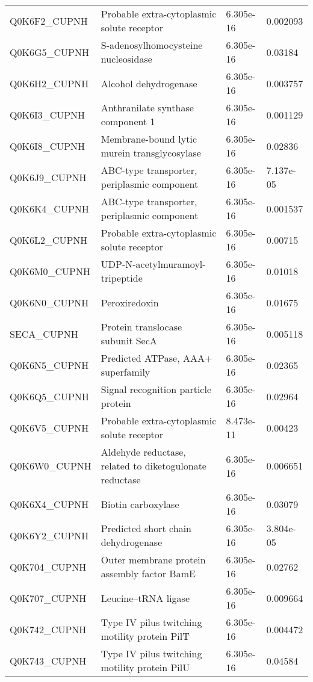 \begin{center}
\begin{longtable}{ l l l l }
Q0K6F2\_CUPNH & Probable extra-cytoplasmic solute receptor& 6.305e-16 & 0.002093 \\ [0.5ex]
Q0K6G5\_CUPNH & S-adenosylhomocysteine nucleosidase& 6.305e-16 & 0.03184 \\ [0.5ex]
Q0K6H2\_CUPNH & Alcohol dehydrogenase& 6.305e-16 & 0.003757 \\ [0.5ex]
Q0K6I3\_CUPNH & Anthranilate synthase component 1& 6.305e-16 & 0.001129 \\ [0.5ex]
Q0K6I8\_CUPNH & Membrane-bound lytic murein transglycosylase& 6.305e-16 & 0.02836 \\ [0.5ex]
Q0K6J9\_CUPNH & ABC-type transporter, periplasmic component & 6.305e-16 & 7.137e-05 \\ [0.5ex]
Q0K6K4\_CUPNH & ABC-type transporter, periplasmic component& 6.305e-16 & 0.001537 \\ [0.5ex]
Q0K6L2\_CUPNH & Probable extra-cytoplasmic solute receptor& 6.305e-16 & 0.00715 \\ [0.5ex]
Q0K6M0\_CUPNH & UDP-N-acetylmuramoyl-tripeptide & 6.305e-16 & 0.01018 \\ [0.5ex]
Q0K6N0\_CUPNH & Peroxiredoxin& 6.305e-16 & 0.01675 \\ [0.5ex]
SECA\_CUPNH & Protein translocase subunit SecA& 6.305e-16 & 0.005118 \\ [0.5ex]
Q0K6N5\_CUPNH & Predicted ATPase, AAA+ superfamily& 6.305e-16 & 0.02365 \\ [0.5ex]
Q0K6Q5\_CUPNH & Signal recognition particle protein& 6.305e-16 & 0.02964 \\ [0.5ex]
Q0K6V5\_CUPNH & Probable extra-cytoplasmic solute receptor& 8.473e-11 & 0.00423 \\ [0.5ex]
Q0K6W0\_CUPNH & Aldehyde reductase, related to diketogulonate reductase& 6.305e-16 & 0.006651 \\ [0.5ex]
Q0K6X4\_CUPNH & Biotin carboxylase& 6.305e-16 & 0.03079 \\ [0.5ex]
Q0K6Y2\_CUPNH & Predicted short chain dehydrogenase& 6.305e-16 & 3.804e-05 \\ [0.5ex]
Q0K704\_CUPNH & Outer membrane protein assembly factor BamE& 6.305e-16 & 0.02762 \\ [0.5ex]
Q0K707\_CUPNH & Leucine--tRNA ligase& 6.305e-16 & 0.009664 \\ [0.5ex]
Q0K742\_CUPNH & Type IV pilus twitching motility protein PilT& 6.305e-16 & 0.004472 \\ [0.5ex]
Q0K743\_CUPNH & Type IV pilus twitching motility protein PilU& 6.305e-16 & 0.04584 \\ [0.5ex]

\end{longtable}
\end{center}

